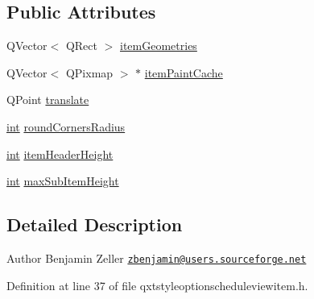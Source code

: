 \subsection*{Public Attributes}
\begin{DoxyCompactItemize}
\item 
Q\-Vector$<$ Q\-Rect $>$ \hyperlink{class_qxt_style_option_schedule_view_item_af08728c38e44e0cb7471e06dc8ab4b64}{item\-Geometries}
\item 
Q\-Vector$<$ Q\-Pixmap $>$ $\ast$ \hyperlink{class_qxt_style_option_schedule_view_item_af23054599e3bdffbef296515e51dcbf1}{item\-Paint\-Cache}
\item 
Q\-Point \hyperlink{class_qxt_style_option_schedule_view_item_a86c041ef9b13f9d7a8c26c28d78d2a48}{translate}
\item 
\hyperlink{ioapi_8h_a787fa3cf048117ba7123753c1e74fcd6}{int} \hyperlink{class_qxt_style_option_schedule_view_item_a202e7285e0a3c6b2302f97759d08c1de}{round\-Corners\-Radius}
\item 
\hyperlink{ioapi_8h_a787fa3cf048117ba7123753c1e74fcd6}{int} \hyperlink{class_qxt_style_option_schedule_view_item_a581247ac9a738a6c7212f4e534ca2379}{item\-Header\-Height}
\item 
\hyperlink{ioapi_8h_a787fa3cf048117ba7123753c1e74fcd6}{int} \hyperlink{class_qxt_style_option_schedule_view_item_adf84c02f222d3fa97fb6520625893c1b}{max\-Sub\-Item\-Height}
\end{DoxyCompactItemize}


\subsection{Detailed Description}
\begin{DoxyAuthor}{Author}
Benjamin Zeller \href{mailto:zbenjamin@users.sourceforge.net}{\tt zbenjamin@users.\-sourceforge.\-net} 
\end{DoxyAuthor}


Definition at line 37 of file qxtstyleoptionscheduleviewitem.\-h.



